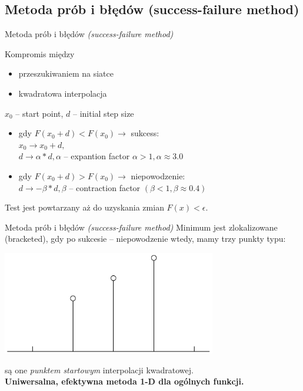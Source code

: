 \subsection{Metoda prób i błędów (success-failure method)}
  \begin{frame}{Metoda prób i błędów \emph{(success-failure method)}}
    \begin{block}{Kompromis między}
      \begin{itemize}
        \item przeszukiwaniem na siatce
        \item kwadratowa interpolacja
      \end{itemize}
    \end{block}
    $x_{0}$ -- start point, $d$ -- initial step size
    \begin{itemize}
      \item gdy $F(x_{0} + d) < F(x_{0}) \to$ sukcess:\\
      $x_{0} \to x_{0} + d,$ \\
      $d \to \alpha * d, \alpha$ -- expantion factor
      $\alpha > 1, \alpha \approx 3.0$
      \item gdy $F(x_{0} + d) > F(x_{0}) \to$ niepowodzenie: \\
      $d \to -\beta * d, \beta$ -- contraction factor
      $(\beta < 1, \beta \approx 0.4)$
    \end{itemize}
    Test jest powtarzany aż do uzyskania zmian $F(x) < \epsilon$.
  \end{frame}

  \begin{frame}{Metoda prób i błędów \emph{(success-failure method)}}
    Minimum jest zlokalizowane (bracketed), gdy po sukcesie
    -- niepowodzenie wtedy, mamy trzy punkty typu:\\ %
    \begin{center}
      \includegraphics[width=0.7\textwidth]{img/17/s-f}
    \end{center}
    są one \emph{punktem startowym} interpolacji kwadratowej.\\
    \textbf{Uniwersalna, efektywna metoda 1-D dla ogólnych funkcji.}
  \end{frame}
